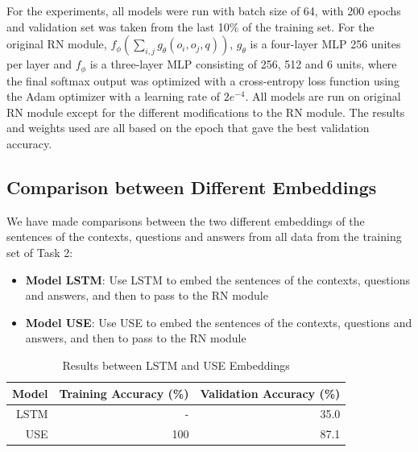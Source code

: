 \documentclass{article}
\begin{document}
 

For the experiments, all models were run with batch size of 64, with 200 epochs and validation set was taken from the last 10\% of the training set. For the original RN module, $f_\phi \left(\sum_{i,j} g_\theta (o_i,o_j,q)\right)$, $g_\theta$ is a four-layer MLP 256 unites per layer and $f_\phi$ is a three-layer MLP consisting of 256, 512 and 6 units, where the final softmax output was optimized with a cross-entropy loss function using the Adam optimizer with a learning rate of $2e^{-4}$. All models are run on original RN module except for the different modifications to the RN module. The results and weights used are all based on the epoch that gave the best validation accuracy.

 

 

\subsection{Comparison between Different Embeddings}

 

 

We have made comparisons between the two different embeddings of the sentences of the contexts, questions and answers from all data from the training set of Task 2:

 

\begin{itemize}

\item \textbf{Model LSTM}: Use LSTM to embed the sentences of the contexts, questions and answers, and then to pass to the RN module

\item \textbf{Model USE}: Use USE to embed the sentences of the contexts, questions and answers, and then to pass to the RN module

\end{itemize}

 
\begin{table}[H]


\begin{center}

\begin{tabular}{|r|r|r|}

 

\hline

\textbf{Model}&\textbf{Training Accuracy (\%)}&\textbf{Validation Accuracy (\%)}\\

\hline

LSTM & - & 35.0\\

\hline

USE & 100 & 87.1\\

\hline

 
\end{tabular}


\label{tab:diffembed}


\end{center}
\caption{Results between LSTM and USE Embeddings}
\end{table} 
\end{document}
